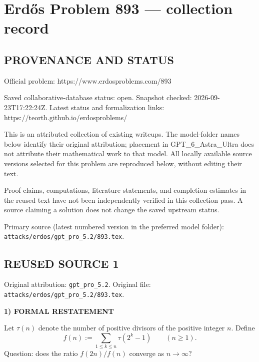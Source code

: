\section*{Erd\H{o}s Problem 893 --- collection record}

\subsection*{PROVENANCE AND STATUS}
Official problem: https://www.erdosproblems.com/893

Saved collaborative-database status: open.
Snapshot checked: 2026-09-23T17:22:24Z.
Latest status and formalization links: https://teorth.github.io/erdosproblems/

This is an attributed collection of existing writeups. The model-folder names below identify their original attribution; placement in GPT\_6\_Astra\_Ultra does not attribute their mathematical work to that model. All locally available source versions selected for this problem are reproduced below, without editing their text.

Proof claims, computations, literature statements, and completion estimates in the reused text have not been independently verified in this collection pass. A source claiming a solution does not change the saved upstream status.

Primary source (latest numbered version in the preferred model folder): \texttt{attacks/erdos/gpt\_pro\_5.2/893.tex}.

\subsection*{REUSED SOURCE 1}
Original attribution: \texttt{gpt\_pro\_5.2}.
Original file: \texttt{attacks/erdos/gpt\_pro\_5.2/893.tex}.



\noindent\textbf{1) FORMAL RESTATEMENT}

Let $\tau(n)$ denote the number of positive divisors of the positive integer $n$.
Define
\[
 f(n):=\sum_{1\le k\le n}\tau(2^k-1) \qquad (n\ge 1).
\]
Question: does the ratio $f(2n)/f(n)$ converge as $n\to\infty$?

